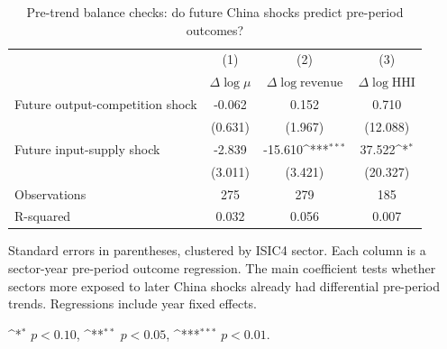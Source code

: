 \begin{table}[htbp]
\centering
\footnotesize
\setlength{\tabcolsep}{8pt}
\renewcommand{\arraystretch}{0.95}
\def\sym#1{\ifmmode^{#1}\else\(^{#1}\)\fi}

\begin{threeparttable}
\caption[Pre-trend balance checks: do future China shocks predict pre-period outcomes?]{Pre-trend balance checks: do future China shocks predict pre-period outcomes?}
\label{tab:pretrend_balance_outputIV}

\begin{tabular}{L{0.34\textwidth}*{3}{c}}
\toprule
& (1) & (2) & (3) \\
& $\Delta \log \mu$ & $\Delta \log \text{revenue}$ & $\Delta \log \text{HHI}$ \\
\midrule
Future output-competition shock
& -0.062 & 0.152 & 0.710 \\
& (0.631) & (1.967) & (12.088) \\
\addlinespace[0.4em]
Future input-supply shock
& -2.839 & -15.610\sym{***} & 37.522\sym{*} \\
& (3.011) & (3.421) & (20.327) \\
\midrule
Observations & 275 & 279 & 185 \\
R-squared    & 0.032 & 0.056 & 0.007 \\
\bottomrule
\end{tabular}

\begin{tablenotes}[flushleft]
\footnotesize
\item Standard errors in parentheses, clustered by ISIC4 sector. Each column is a sector-year pre-period outcome regression. The main coefficient tests whether sectors more exposed to later China shocks already had differential pre-period trends. Regressions include year fixed effects.
\item \sym{*} $p<0.10$, \sym{**} $p<0.05$, \sym{***} $p<0.01$.
\end{tablenotes}

\end{threeparttable}
\end{table}
